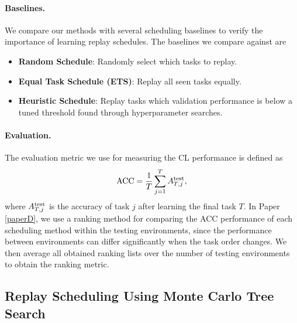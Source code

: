 \paragraph{Baselines.} We compare our methods with several scheduling baselines to verify the importance of learning replay schedules. The baselines we compare against are
\begin{itemize}[itemsep=0em,topsep=1pt]
	\item {\bf Random Schedule}: Randomly select which tasks to replay.
	\item {\bf Equal Task Schedule (ETS)}: Replay all seen tasks equally.
	\item {\bf Heuristic Schedule}: Replay tasks which validation performance is below a tuned threshold found through hyperparameter searches.
\end{itemize} 

\vspace{-3mm}
\paragraph{Evaluation.} The evaluation metric we use for measuring the CL performance is defined as
\begin{align}
	{\text{ACC}} = \frac{1}{T} \sum_{j=1}^{T} A_{T, j}^{{\text{test}}},
\end{align}
where $A_{T, j}^{{\text{test}}}$ is the accuracy of task $j$ after learning the final task $T$.  In Paper \ref{paperD}, we use a ranking method for comparing the ACC performance of each scheduling method within the testing environments, since the performance between environments can differ significantly when the task order changes. We then average all obtained ranking lists over the number of testing environments to obtain the ranking metric. 


\subsection{Replay Scheduling Using Monte Carlo Tree Search}

